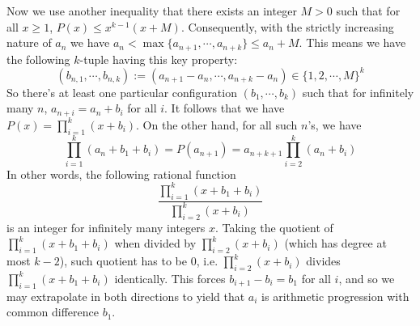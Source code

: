 \documentclass[11pt,a4paper]{article}
\begin{document}
\begin{enumerate}
		Now we use another inequality that there exists an integer $M>0$ such that for all $x\ge 1$, 
		$P(x)\le x^{k-1}(x+M)$. 
		Consequently, with the strictly increasing nature of $a_n$ we have $a_n < \max \{a_{n+1}, \cdots, a_{n+k}\}\le a_n+M$. 
		This means we have the following $k$-tuple having this key property: 
		\[
		(b_{n, 1}, \cdots, b_{n, k}) := (a_{n+1} - a_n, \cdots, a_{n+k}-a_n)\in \{1, 2, \cdots, M\}^k
		\]
		So there's at least one particular configuration $(b_1, \cdots, b_k)$ such that for infinitely many $n$, 
		$a_{n+i}=a_n+b_i$ for all $i$. 
		It follows that we have $P(x)=\prod_{i=1}^k (x+b_i)$. On the other hand, 
		for all such $n$'s, we have 
		\[
		\prod_{i=1}^k (a_n + b_1 +b_i) = P(a_{n+1}) = a_{n+k+1}\prod_{i=2}^k (a_n + b_i)
		\]
		In other words, the following rational function
		\[
		\frac{\prod_{i=1}^k (x + b_1 +b_i)}{\prod_{i=2}^k (x + b_i)}
		\]
		is an integer for infinitely many integers $x$. Taking the quotient of $\prod_{i=1}^k (x + b_1 +b_i)$ when divided by $\prod_{i=2}^k (x + b_i)$ (which has degree at most $k-2$), such quotient has to be 0, 
		i.e. $\prod_{i=2}^k (x + b_i)$ divides $\prod_{i=1}^k (x + b_1 +b_i)$ identically. 
		This forces $b_{i+1}-b_i=b_1$ for all $i$, and so we may extrapolate in both directions to yield that $a_i$ is arithmetic progression with common difference $b_1$. 
		
	 \end{enumerate}
    
\end{document}
